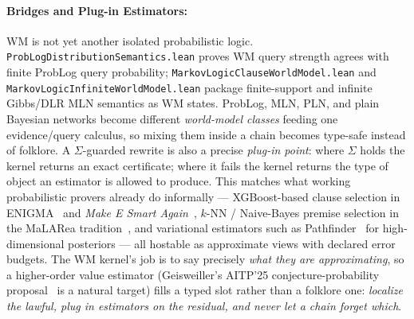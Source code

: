 \documentclass{easychair}
\newcommand{\side}{\Sigma}
\renewcommand{\code}[1]{\texttt{#1}}
\begin{document}
\paragraph*{Bridges and Plug-in Estimators:}
WM is not yet another isolated probabilistic logic.  \code{ProbLogDistributionSemantics.lean} proves WM query strength agrees with finite ProbLog query probability; \code{MarkovLogicClauseWorldModel.lean} and \code{MarkovLogicInfiniteWorldModel.lean} package finite-support and infinite Gibbs/DLR MLN semantics as WM states.  ProbLog, MLN, PLN, and plain Bayesian networks become different \emph{world-model classes} feeding one evidence/query calculus, so mixing them inside a chain becomes type-safe instead of folklore.
A $\side$-guarded rewrite is also a precise \emph{plug-in point}: where $\side$ holds the kernel returns an exact certificate; where it fails the kernel returns the type of object an estimator is allowed to produce.  This matches what working probabilistic provers already do informally --- XGBoost-based clause selection in ENIGMA~\cite{JakubuvU17a} and \emph{Make E Smart Again}~\cite{goertzelmakeESmart}, $k$-NN / Naive-Bayes premise selection in the MaLARea tradition~\cite{USPJ:IJCAR-2008}, and variational estimators such as Pathfinder~\cite{pathfinder} for high-dimensional posteriors --- all hostable as approximate views with declared error budgets.  The WM kernel's job is to say precisely \emph{what they are approximating}, so a higher-order value estimator (Geisweiller's AITP'25 conjecture-probability proposal~\cite{Geisweiller25PLN} is a natural target) fills a typed slot rather than a folklore one: \emph{localize the lawful, plug in estimators on the residual, and never let a chain forget which}.

\vspace{-3mm}
\end{document}
